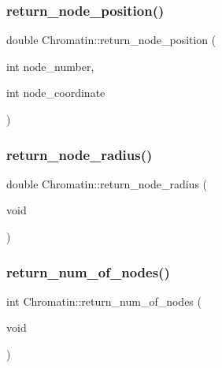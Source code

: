 \subsubsection{\texorpdfstring{return\_node\_position()}{return\_node\_position()}}
{\footnotesize\ttfamily double Chromatin\+::return\+\_\+node\+\_\+position (\begin{DoxyParamCaption}\item[{int}]{node\+\_\+number,  }\item[{int}]{node\+\_\+coordinate }\end{DoxyParamCaption})\hspace{0.3cm}{\ttfamily [inline]}}

\mbox{\label{classChromatin_a6b3dc72635d71b50654ba6106d6c3b25}} 
\subsubsection{\texorpdfstring{return\_node\_radius()}{return\_node\_radius()}}
{\footnotesize\ttfamily double Chromatin\+::return\+\_\+node\+\_\+radius (\begin{DoxyParamCaption}\item[{void}]{ }\end{DoxyParamCaption})\hspace{0.3cm}{\ttfamily [inline]}}

\mbox{\label{classChromatin_adaea32233fd4347b7ba86fb9df18ed18}} 
\subsubsection{\texorpdfstring{return\_num\_of\_nodes()}{return\_num\_of\_nodes()}}
{\footnotesize\ttfamily int Chromatin\+::return\+\_\+num\+\_\+of\+\_\+nodes (\begin{DoxyParamCaption}\item[{void}]{ }\end{DoxyParamCaption})\hspace{0.3cm}{\ttfamily [inline]}}

\mbox{\label{classChromatin_a3187fb5d0aacdf6109af3bbb85a66aa9}} 
